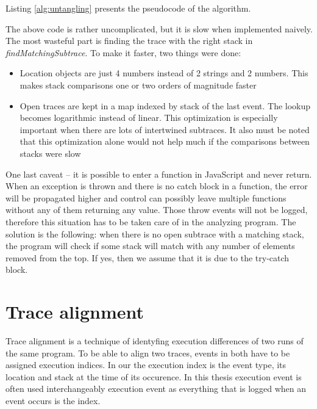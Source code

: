 Listing \ref{alg:untangling} presents the pseudocode of the algorithm.



The above code is rather uncomplicated, but it is slow when implemented naively.
The most wasteful part is finding the trace with the right stack in \emph{findMatchingSubtrace}.
To make it faster, two things were done:
\begin{itemize}
  \item Location objects are just 4 numbers instead of 2 strings and 2 numbers. This makes stack comparisons
           one or two orders of magnitude faster
  \item Open traces are kept in a map indexed by stack of the last event. 
  			The lookup becomes logarithmic instead of linear. This optimization is especially important when there are lots
  			of intertwined subtraces. It also must be noted that this optimization alone would not help much if the comparisons 
  			between stacks were slow
\end{itemize} 

One last caveat -- it is possible to enter a function in JavaScript and never return.
When an exception is thrown and there is no catch block in a function, the error will
be propagated higher and control can possibly leave multiple functions without any of them returning any value.
Those throw events will not be logged, therefore this situation has to be taken care of
in the analyzing program. The solution is the following: when there is no open subtrace with a matching stack,
the program will check if some stack will match with any number of elements removed from the top.
If yes, then we assume that it is due to the try-catch block.


\section{Trace alignment}
\label{trace-alignment}

Trace alignment is a technique of identyfing execution differences of two runs of the same program.
To be able to align two traces, events in both have to be assigned execution indices.
In our the execution index is the event type, its location and stack at the time of its occurence.
In this thesis execution event is often used interchangeably execution event as everything that is
logged when an event occurs is the index.

